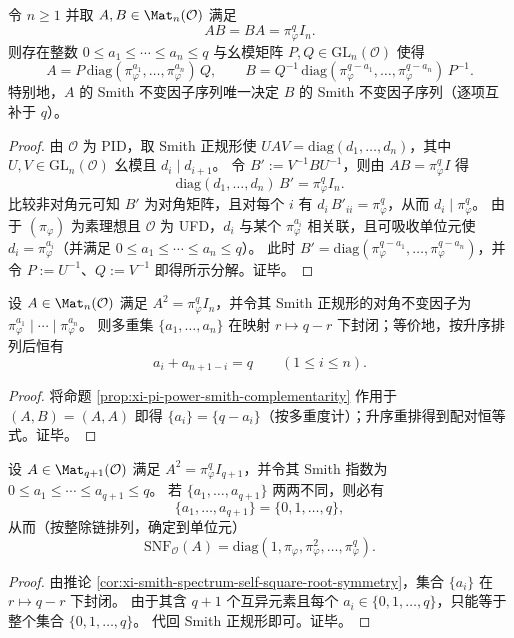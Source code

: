 \begin{proposition}\label{prop:xi-pi-power-smith-complementarity}
令 \(n\ge 1\) 并取 \(A,B\in\Mat_n(\mathcal O)\) 满足
\[
AB=BA=\pi_\varphi^{q}I_n.
\]
则存在整数 \(0\le a_1\le\cdots\le a_n\le q\) 与幺模矩阵 \(P,Q\in\mathrm{GL}_n(\mathcal O)\) 使得
\[
A=P\,\mathrm{diag}(\pi_\varphi^{a_1},\dots,\pi_\varphi^{a_n})\,Q,
\qquad
B=Q^{-1}\,\mathrm{diag}(\pi_\varphi^{q-a_1},\dots,\pi_\varphi^{q-a_n})\,P^{-1}.
\]
特别地，\(A\) 的 Smith 不变因子序列唯一决定 \(B\) 的 Smith 不变因子序列（逐项互补于 \(q\)）。
\end{proposition}
\begin{proof}
由 \(\mathcal O\) 为 PID，取 Smith 正规形使
\(
UAV=\mathrm{diag}(d_1,\dots,d_n)
\)，其中 \(U,V\in\mathrm{GL}_n(\mathcal O)\) 幺模且 \(d_i\mid d_{i+1}\)。
令 \(B':=V^{-1}BU^{-1}\)，则由 \(AB=\pi_\varphi^qI\) 得
\[
\mathrm{diag}(d_1,\dots,d_n)\,B'=\pi_\varphi^q I_n.
\]
比较非对角元可知 \(B'\) 为对角矩阵，且对每个 \(i\) 有 \(d_i\,B'_{ii}=\pi_\varphi^q\)，从而 \(d_i\mid \pi_\varphi^q\)。
由于 \((\pi_\varphi)\) 为素理想且 \(\mathcal O\) 为 UFD，\(d_i\) 与某个 \(\pi_\varphi^{a_i}\) 相关联，且可吸收单位元使 \(d_i=\pi_\varphi^{a_i}\)（并满足 \(0\le a_1\le\cdots\le a_n\le q\)）。
此时 \(B'=\mathrm{diag}(\pi_\varphi^{q-a_1},\dots,\pi_\varphi^{q-a_n})\)，并令 \(P:=U^{-1}\)、\(Q:=V^{-1}\) 即得所示分解。证毕。
\end{proof}

\begin{corollary}\label{cor:xi-smith-spectrum-self-square-root-symmetry}
设 \(A\in\Mat_n(\mathcal O)\) 满足 \(A^2=\pi_\varphi^q I_n\)，并令其 Smith 正规形的对角不变因子为
\(
\pi_\varphi^{a_1}\mid\cdots\mid \pi_\varphi^{a_n}
\)。
则多重集 \(\{a_1,\dots,a_n\}\) 在映射 \(r\mapsto q-r\) 下封闭；等价地，按升序排列后恒有
\[
a_i+a_{n+1-i}=q\qquad(1\le i\le n).
\]
\end{corollary}
\begin{proof}
将命题 \ref{prop:xi-pi-power-smith-complementarity} 作用于 \((A,B)=(A,A)\) 即得 \(\{a_i\}=\{q-a_i\}\)（按多重度计）；升序重排得到配对恒等式。证毕。
\end{proof}

\begin{corollary}[互异指数的阶梯刚性]\label{cor:xi-smith-staircase-rigidity-distinct}
设 \(A\in\Mat_{q+1}(\mathcal O)\) 满足 \(A^2=\pi_\varphi^q I_{q+1}\)，并令其 Smith 指数为 \(0\le a_1\le\cdots\le a_{q+1}\le q\)。
若 \(\{a_1,\dots,a_{q+1}\}\) 两两不同，则必有
\[
\{a_1,\dots,a_{q+1}\}=\{0,1,\dots,q\},
\]
从而（按整除链排列，确定到单位元）
\[
\mathrm{SNF}_{\mathcal O}(A)=\mathrm{diag}(1,\pi_\varphi,\pi_\varphi^2,\dots,\pi_\varphi^{q}).
\]
\end{corollary}
\begin{proof}
由推论 \ref{cor:xi-smith-spectrum-self-square-root-symmetry}，集合 \(\{a_i\}\) 在 \(r\mapsto q-r\) 下封闭。
由于其含 \(q+1\) 个互异元素且每个 \(a_i\in\{0,1,\dots,q\}\)，只能等于整个集合 \(\{0,1,\dots,q\}\)。
代回 Smith 正规形即可。证毕。
\end{proof}

